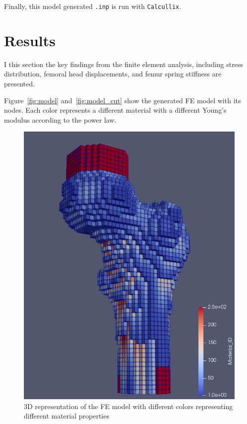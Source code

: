 \documentclass[a4paper,12pt]{article}
\begin{document}
    Finally, this model generated \texttt{.inp} is run with \texttt{Calcullix}.


    \section{Results}\label{sec:results}
    I this section the key findings from the finite element analysis, including stress distribution, femoral head displacements, and femur spring stiffness are presented.

    \vspace{10pt}
    Figure~\ref{fig:model} and~\ref{fig:model_cut} show the generated FE model with its nodes.
    Each color represents a different material with a different Young's modulus according to the power law.

    \begin{figure}[htbp]
        \centering
        \begin{minipage}[b]{0.49\textwidth}
            \includegraphics[width=\textwidth]{model}
            \caption{3D representation of the FE model with different colors representing different material properties}

\end{minipage}
\end{figure}
\end{document}
